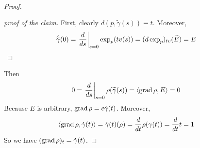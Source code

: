 \begin{enumerate}[label=\arabic{*}]
\begin{proof}
\begin{proof}[proof of the claim]
			First, clearly $d(p,\widetilde{\gamma}(s)) \equiv t$. Moreover,
			\begin{equation*}
				\dot{\widetilde{\gamma}}(0) = \left.\frac{d}{ds}\right\lvert_{s=0}\exp_p(tv(s)) = (d\exp_p)_{tv}(\widetilde{E}) = E \qedhere
			\end{equation*}
		\end{proof}
		Then
		\begin{equation*}
			0 = \left.\frac{d}{ds}\right\lvert_{s=0}\rho(\widetilde{\gamma}(s)) = \left\langle \operatorname{grad}\rho,E \right\rangle = 0
		\end{equation*}
		Because $E$ is arbitrary, $\operatorname{grad}\rho = c\dot{\gamma}(t)$.  Moreover, 
		\begin{equation*}
			\left\langle \operatorname{grad}\rho,\dot{\gamma}(t) \right\rangle = \dot{\gamma}(t)(\rho) = \frac{d}{dt} \rho(\gamma(t)) = \frac{d}{dt} t = 1
		\end{equation*}
		So we have $(\operatorname{grad}\rho)_t = \dot{\gamma}(t)$.
	\end{proof}


\end{enumerate}
